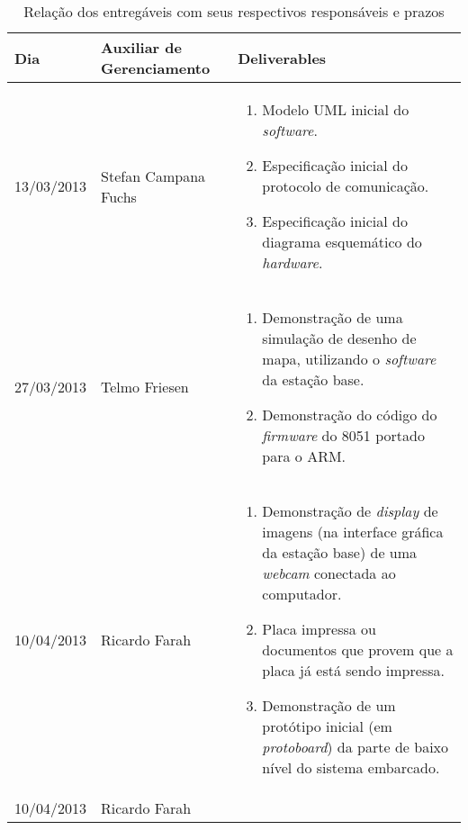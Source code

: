 \begin{table}[!h]
  \centering
  \caption{Relação dos entregáveis com seus respectivos responsáveis e prazos}
  \begin{tabular}{p{3cm}|p{4cm}||p{7cm}}
    \toprule
    \textbf{Dia}   & \textbf{Auxiliar de Gerenciamento} & \textbf{Deliverables} \\
    \hline
    13/03/2013 & Stefan Campana Fuchs & 
    \begin{enumerate}[topsep=0pt, partopsep=0pt, itemsep=0pt]
      \item Modelo UML inicial do \textit{software}.
      \item Especificação inicial do protocolo de comunicação.
      \item Especificação inicial do diagrama esquemático do \textit{hardware}.
    \end{enumerate}\\
    \hline
    27/03/2013 & Telmo Friesen & 
    \begin{enumerate}[topsep=0pt, partopsep=0pt, itemsep=0pt]
      \item Demonstração de uma simulação de desenho de mapa, utilizando o \textit{software} da estação base.
      \item Demonstração do código do \textit{firmware} do 8051 portado para o ARM.
    \end{enumerate}\\
    \hline
    10/04/2013 & Ricardo Farah & 
    \begin{enumerate}[topsep=0pt, partopsep=0pt, itemsep=0pt]
      \item Demonstração de \textit{display} de imagens (na interface gráfica da estação base) de uma \textit{webcam} conectada ao computador.
      \item Placa impressa ou documentos que provem que a placa já está sendo impressa.
      \item Demonstração de um protótipo inicial (em \textit{protoboard}) da parte de baixo nível do sistema embarcado.
    \end{enumerate}\\
    10/04/2013 & Ricardo Farah & 

\end{tabular}
\end{table}
